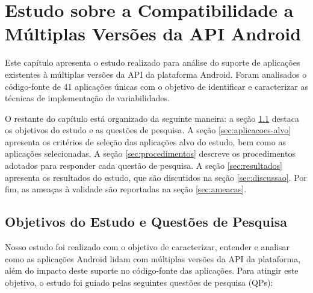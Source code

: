 \chapter{Estudo sobre a Compatibilidade a Múltiplas Versões da API Android}
\label{ch:estudo}

Este capítulo apresenta o estudo realizado para análise do suporte de aplicações
existentes à múltiplas versões da API da plataforma Android. Foram analisados o
código-fonte de 41 aplicações únicas com o objetivo de identificar e caracterizar
as técnicas de implementação de variabilidades.

O restante do capítulo está organizado da seguinte maneira: 
a seção \ref{sec:objetivos} destaca os objetivos do estudo e as questões de pesquisa.
A seção \ref{sec:aplicacoes-alvo} apresenta os critérios de seleção das aplicações
alvo do estudo, bem como as aplicações selecionadas.
A seção \ref{sec:procedimentos} descreve os procedimentos adotados para responder
cada questão de pesquisa. 
A seção \ref{sec:resultados} apresenta os resultados do estudo, que são discutidos na
seção \ref{sec:discussao}.
Por fim, as ameaças à validade são reportadas na seção \ref{sec:ameacas}.

\section{Objetivos do Estudo e Questões de Pesquisa} \label{sec:objetivos}

Nosso estudo foi realizado com o objetivo de caracterizar, entender e analisar
como as aplicações Android lidam com múltiplas versões da API da plataforma, além
do impacto deste suporte no código-fonte das aplicações. Para atingir este objetivo,
o estudo foi guiado pelas seguintes questões de pesquisa (QPs):

